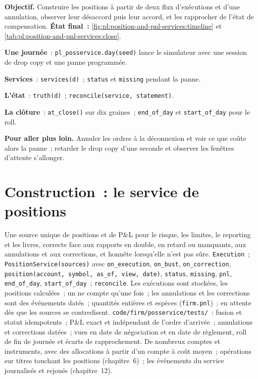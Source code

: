 \begin{tutorial}
\textbf{Objectif.} Construire les positions à partir de deux flux d'exécutions et d'une annulation, observer leur désaccord puis leur accord, et les rapprocher de l'état de compensation.
\textbf{État final~:} \cref{fig:pl:position-and-pnl-services:timeline} et \cref{tab:pl:position-and-pnl-services:close}.
\begin{tutsteps}
\item \textbf{Une journée}~: \texttt{pl\_posservice.day(seed)} lance le simulateur avec une session de drop copy et une panne programmée.
\item \textbf{Services}~: \texttt{services(d)}~; \texttt{status} et \texttt{missing} pendant la panne.
\item \textbf{L'état}~: \texttt{truth(d)}~; \texttt{reconcile(service, statement)}.
\item \textbf{La clôture}~: \texttt{at\_close()} sur dix graines~; \texttt{end\_of\_day} et \texttt{start\_of\_day} pour le roll.
\end{tutsteps}
\textbf{Pour aller plus loin.} Annuler les ordres à la déconnexion et voir ce que coûte alors la panne~; retarder le drop copy d'une seconde et observer les
fenêtres d'attente s'allonger.
\end{tutorial}

\section{Construction~: le service de positions}\label{bld:pl:position-and-pnl-services:posservice}

\begin{build}
 Une source unique de positions et de P\&L pour le risque, les limites, le reporting et les livres, correcte face aux rapports en double, en retard ou manquants,
aux annulations et aux corrections, et honnête lorsqu'elle n'est pas sûre.
 \texttt{Execution}~; \texttt{PositionService(sources)} avec \texttt{on\_execution}, \texttt{on\_bust},
\texttt{on\_correction}, \texttt{position(account, symbol, as\_of, view, date)}, \texttt{status}, \texttt{missing}, \texttt{pnl},
\texttt{end\_of\_day}, \texttt{start\_of\_day}~; \texttt{reconcile}.
 Les exécutions sont stockées, les positions calculées~; un  ne compte qu'une fois~; les annulations et les corrections sont des événements datés~;
quantités entières et espèces (\texttt{firm.pnl})~; en attente dès que les sources se contredisent.
 \texttt{code/firm/posservice/tests/}~: fusion et statut idempotents~; P\&L exact et indépendant de l'ordre d'arrivée~;
annulations et corrections datées~; vues en date de négociation et en date de règlement, roll de fin de journée et écarts de rapprochement.
 De nombreux comptes et instruments, avec des allocations à partir d'un compte à coût moyen~; opérations sur titres touchant les positions (chapitre~6)~;
les événements du service journalisés et rejoués (chapitre~12).
\end{build}

